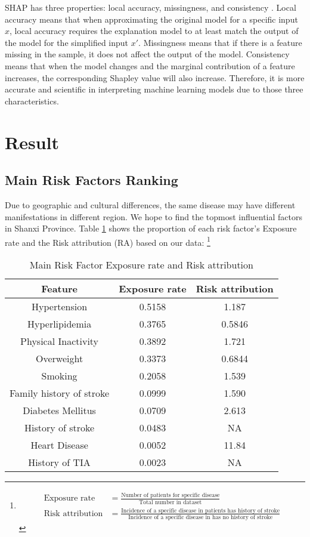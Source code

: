 \documentclass{article}
\begin{document}
 SHAP has three properties: local accuracy, missingness, and consistency \cite{shap2017interpretation}. Local accuracy means that when approximating the original model for a specific input $x$, local accuracy requires the explanation model to at least match the output of the model for the simplified input $x'$. Missingness means that if there is a feature missing in the sample, it does not affect the output of the model. Consistency means that when the model changes and the marginal contribution of a feature increases, the corresponding Shapley value will also increase. Therefore, it is more accurate and scientific in interpreting machine learning models due to those three characteristics.

\section{Result}\label{section:results}
\subsection{Main Risk Factors Ranking}
 Due to geographic and cultural differences, the same disease may have different manifestations in different region. We hope to find the topmost influential factors in Shanxi Province. Table \ref{table:Risk-factor-exposure} shows the proportion of each risk factor's Exposure rate and the Risk attribution (RA) based on our data:
 \footnote{
\begin{align*}
    \text{Exposure rate} &= \frac{\text{Number of patients for specific disease}}{\text{Total number in dataset}} \\ 
    \text{Risk attribution} &= \frac{\text{Incidence of a specific disease in patients has history of stroke}}{\text{Incidence of a specific disease in has no history of stroke}}
\end{align*}}
\begin{table}[H]
\small
\centering
\begin{tabular}{ccc}
\hline
\multicolumn{1}{c}{\textbf{Feature}}&\multicolumn{1}{c}{\textbf{Exposure rate}} & \multicolumn{1}{c}{\textbf{Risk attribution}}\\ \hline
Hypertension                & 0.5158  & 1.187  \\
Hyperlipidemia              & 0.3765  & 0.5846 \\
Physical Inactivity         & 0.3892  & 1.721  \\
Overweight                  & 0.3373  & 0.6844 \\
Smoking                     & 0.2058  & 1.539  \\
Family history of stroke    & 0.0999  & 1.590 \\
Diabetes Mellitus           & 0.0709  & 2.613 \\
History of stroke           & 0.0483  & NA \\
Heart Disease               & 0.0052  & 11.84 \\
History of TIA              & 0.0023  & NA  \\ \hline
\end{tabular}
\caption{Main Risk Factor Exposure rate and Risk attribution} \label{table:Risk-factor-exposure}
\end{table}
\end{document}
